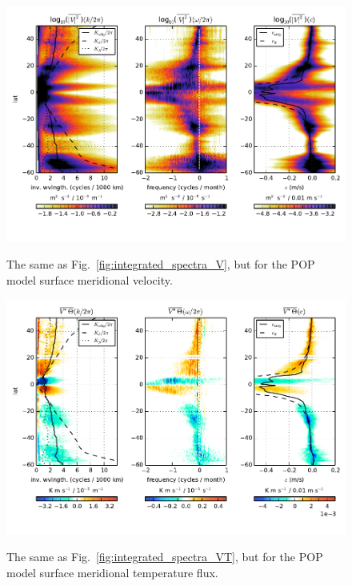 \documentclass[10pt]{article}
\begin{document}
\begin{figure}[t]
  \noindent\includegraphics{../figures/POP_50degwide/integrated_spectra_V.pdf}\\
  \caption{The same as Fig.~\ref{fig:integrated_spectra_V}, but for the POP model surface meridional velocity.}
  \label{fig:integrated_spectra_V_POP}
\end{figure}

\begin{figure}[t]
  \noindent\includegraphics{../figures/POP_50degwide/integrated_spectra_VT.pdf}\\
  \caption{The same as Fig.~\ref{fig:integrated_spectra_VT}, but for the POP model surface meridional temperature flux.}
  \label{fig:integrated_spectra_VT_POP}
\end{figure}
\end{document}
